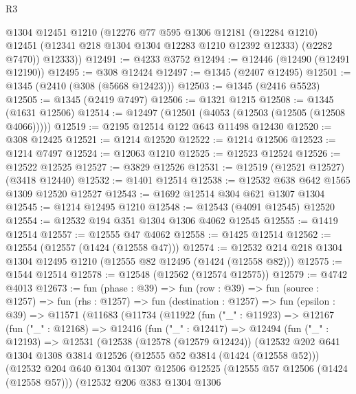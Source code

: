 \begin{lexlean}{R3}
\begin{coremodule}
        @1304
        @12451
        @1210
        (@12276
          @77
          @595
          @1306
          @12181
          (@12284 @1210)
          @12451
          (@12341 @218 @1304 @1304 @12283 @1210 @12392 @12333)
          (@2282 @7470))
        @12333))
@12491 := @4233 @3752
@12494 := @12446 (@12490 (@12491 @12190))
@12495 := @308 @12424
@12497 := @1345 (@2407 @12495)
@12501 := @1345 (@2410 (@308 (@5668 @12423)))
@12503 := @1345 (@2416 @5523)
@12505 := @1345 (@2419 @7497)
@12506 := @1321 @1215
@12508 := @1345 (@1631 @12506)
@12514 := @12497 (@12501 (@4053 (@12503 (@12505 (@12508 @4066)))))
@12519 := @2195 @12514 @122 @643 @11498 @12430
@12520 := @308 @12425
@12521 := @1214 @12520
@12522 := @1214 @12506
@12523 := @1214 @7497
@12524 := @12063 @1210
@12525 := @12523 @12524
@12526 := @12522 @12525
@12527 := @3829 @12526
@12531 := @12519 (@12521 @12527) (@3418 @12440)
@12532 := @1401 @12514
@12538 := @12532 @638 @642 @1565 @1309 @12520 @12527
@12543 := @1692 @12514 @304 @621 @1307 @1304
@12545 := @1214 @12495 @1210
@12548 := @12543 (@4091 @12545) @12520
@12554 := @12532 @194 @351 @1304 @1306 @4062 @12545
@12555 := @1419 @12514
@12557 := @12555 @47 @4062
@12558 := @1425 @12514
@12562 := @12554 (@12557 (@1424 (@12558 @47)))
@12574 := @12532 @214 @218 @1304 @1304 @12495 @1210 (@12555 @82 @12495 (@1424 (@12558 @82)))
@12575 := @1544 @12514
@12578 := @12548 (@12562 (@12574 @12575))
@12579 := @4742 @4013
@12673 := fun (phase : @39) =>
  fun (row : @39) =>
  fun (source : @1257) =>
  fun (rhs : @1257) =>
  fun (destination : @1257) =>
  fun (epsilon : @39) =>
  @11571
    (@11683
      (@11734
        (@11922
          (fun ("_" : @11923) =>
          @12167
            (fun ("_" : @12168) =>
            @12416
              (fun ("_" : @12417) =>
              @12494
                (fun ("_" : @12193) =>
                @12531
                  (@12538
                    (@12578 (@12579 @12424))
                    (@12532
                      @202
                      @641
                      @1304
                      @1308
                      @3814
                      @12526
                      (@12555 @52 @3814 (@1424 (@12558 @52)))
                      (@12532
                        @204
                        @640
                        @1304
                        @1307
                        @12506
                        @12525
                        (@12555 @57 @12506 (@1424 (@12558 @57)))
                        (@12532
                          @206
                          @383
                          @1304
                          @1306

\end{coremodule}
\end{lexlean}

